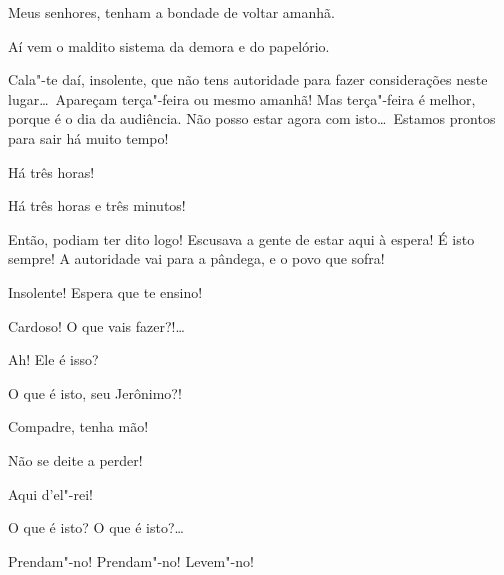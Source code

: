  Meus senhores, tenham a bondade de voltar amanhã.

 Aí vem o maldito sistema da demora e do papelório.

 Cala"-te daí, insolente, que não tens autoridade para fazer
considerações neste lugar\ldots\ Apareçam
terça"-feira ou mesmo amanhã! Mas terça"-feira é melhor, porque é o dia da
audiência. Não posso estar agora
com isto\ldots\ Estamos prontos para sair há muito tempo!

 Há três horas!

  Há três horas e três
minutos!

  Então, podiam ter dito logo!
Escusava a gente de estar aqui à espera! É isto
sempre! A autoridade vai para a pândega, e o povo que sofra!

 Insolente! Espera que te ensino! 

 Cardoso! O que vais fazer?!\ldots

 Ah! Ele é isso? 

 O que é isto, seu Jerônimo?!

 Compadre, tenha mão!

 Não se deite a perder!

  Aqui d’el"-rei!




 O que é isto? O que é isto?\ldots\ 

 Prendam"-no! Prendam"-no! 
Levem"-no!  




